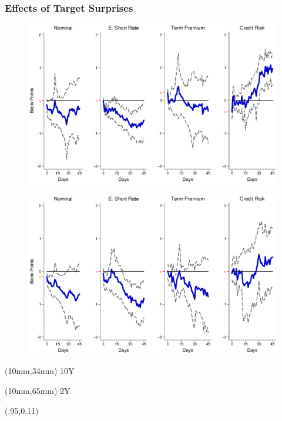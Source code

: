 \documentclass[12pt, aspectratio=169, xcolor=dvipsnames]{beamer}  %
\begin{document}
\begin{frame}[label=TargetEM]
	\frametitle{Effects of Target Surprises}
	\begin{figure}[!htbp]
		\begin{center} %
			\includegraphics[trim={0cm 0cm 0cm 0cm},clip,height=0.4\textheight,width=0.85\linewidth]{../Figures/LPs/LagDep-FX/Target/EM/TargetEMnomyptpphi120m.eps}
			\par\end{center}
	\end{figure}
	\vspace{-0.5cm}
	\begin{figure}[!htbp]
		\begin{center} %
			\includegraphics[trim={0cm 0cm 0cm 0.76cm},clip,height=0.4\textheight,width=0.85\linewidth]{../Figures/LPs/LagDep-FX/Target/EM/TargetEMnomyptpphi24m.eps}
			\par\end{center}
	\end{figure}
	\begin{textblock*}{8mm}(10mm,34mm)
		\small 10Y
	\end{textblock*}
	\begin{textblock*}{8mm}(10mm,65mm)
		\small 2Y
	\end{textblock*}
\begin{textblock*}{5cm}(.95\textwidth,0.11\textheight)
	\hyperlink{TargetUS}{}
\end{textblock*}
\end{frame}
\end{document}
